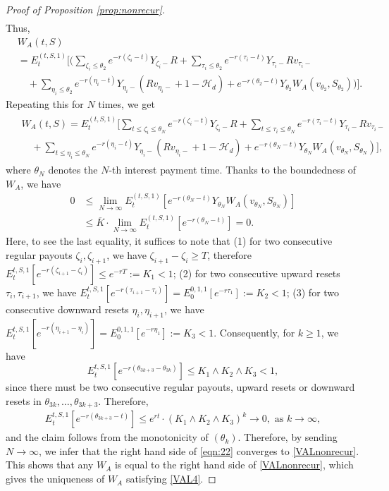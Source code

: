 \documentclass[draft, noinfoline]{ectaart}
\numberwithin{equation}{section}
\theoremstyle{plain}
\begin{document}
\begin{appendices}
\begin{proof}[Proof of Proposition \ref{prop:nonrecur}]
\begin{align*}
	\end{align*}
	Thus,
	\begin{align*}
	&W_A(t,S) \\
	&=E_t^{(t,S,1)}\Bigg[\Bigg(\sum_{\zeta_i\le\theta_2}e^{-r(\zeta_i-t)}Y_{\zeta_i-}R+\sum_{\tau_i\le\theta_2}e^{-r(\tau_i-t)}Y_{\tau_i-}Rv_{\tau_i-}\\
	&\quad+\sum_{\eta_i\le\theta_2}e^{-r(\eta_i-t)}Y_{\eta_i-}(Rv_{\eta_i-}+1-\mathcal{H}_d)+e^{-r(\theta_2-t)}Y_{\theta_2} W_A(v_{\theta_2},S_{\theta_2})\Bigg)\Bigg].
	\end{align*}
	Repeating this for $N$ times, we get
	\begin{align}\label{eqn:22}
	\begin{split}
	&W_A(t,S)=E_t^{(t,S,1)}\Bigg[\sum_{t\le \zeta_i\le\theta_N}e^{-r(\zeta_i-t)}Y_{\zeta_i-}R+\sum_{t\le \tau_i\le \theta_N}e^{-r(\tau_i-t)}Y_{\tau_i-}Rv_{\tau_i-}\\
	&\quad+\sum_{t\le\eta_i\le \theta_N}e^{-r(\eta_i-t)}Y_{\eta_i-}(Rv_{\eta_i-}+1-\mathcal{H}_d)+e^{-r(\theta_N-t)}Y_{\theta_N}W_A(v_{\theta_N},S_{\theta_N})\Bigg],
	\end{split}
	\end{align}
	where $\theta_N$ denotes the $N$-th interest payment time. Thanks to the boundedness of $W_A$, we have
	\begin{align*}
	0&\le \lim_{N\to\infty}E_t^{(t,S,1)}\left[e^{-r(\theta_N-t)}Y_{\theta_N}W_A(v_{\theta_N},S_{\theta_N})\right] \\
	&\le \overline{K}\cdot\lim_{N\to\infty}E_t^{(t,S,1)}\left[e^{-r(\theta_N-t)}\right]=0.
	\end{align*}
	Here, to see the last equality, it suffices to note that (1) for two consecutive regular payouts $\zeta_i,\zeta_{i+1}$, we have $\zeta_{i+1}-\zeta_{i}\ge T$, therefore $E_t^{t,S,1}\left[e^{-r(\zeta_{i+1}-\zeta_i)}\right]\le e^{-rT}:=K_1<1$; (2) for two consecutive upward resets $\tau_i,\tau_{i+1}$, we have $E_t^{t,S,1}\left[e^{-r(\tau_{i+1}-\tau_i)}\right]=E_0^{0,1,1}\left[e^{-r\tau_1}\right]:=K_2<1$; (3) for two consecutive downward resets $\eta_i,\eta_{i+1}$, we have $E_t^{t,S,1}\left[e^{-r(\eta_{i+1}-\eta_i)}\right]=E_0^{0,1,1}\left[e^{-r\eta_1}\right]:=K_3<1$. Consequently, for $k\ge 1$, we have $$E_t^{t,S,1}\left[e^{-r(\theta_{3k+3}-\theta_{3k})}\right]\le K_1\land K_2\land K_3<1,$$
	since there must be two consecutive regular payouts, upward resets or downward resets in $\theta_{3k},\ldots,\theta_{3k+3}$. Therefore, 
	\begin{align*}
		E_t^{t,S,1}\left[e^{-r(\theta_{3k+3}-t)}\right]\le e^{rt}\cdot(K_1\land K_2\land K_3)^k\to 0,\text{ as }k\to\infty,
	\end{align*}
	and the claim follows from the monotonicity of $(\theta_k)$. Therefore, by sending $N\to\infty$, we infer that the right hand side of \eqref{eqn:22} converges to \eqref{VALnonrecur}. This shows that any $W_A$ is equal to the right hand side of \eqref{VALnonrecur}, which gives the uniqueness of $W_A$ satisfying \eqref{VAL4}.
\end{proof}



\end{appendices}
\end{document}
